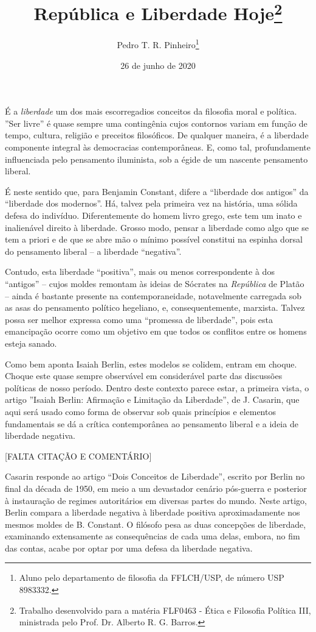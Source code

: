 \documentclass[12pt,a4paper]{article}
\author{Pedro T. R. Pinheiro\footnote{Aluno pelo departamento de filosofia 
da FFLCH/USP, de número USP 8983332. }}
\title{República e Liberdade Hoje\footnote{
	Trabalho desenvolvido para a matéria FLF0463 - Ética e Filosofia 
	Política III, ministrada pelo Prof. Dr. Alberto R. G. Barros. }}
\date{26 de junho de 2020}
\begin{document}
	\maketitle
	
	\onehalfspacing
	\setlength{\parskip}{0.5cm}

	É a \textit{liberdade} um dos mais escorregadios conceitos da 
	filosofia moral e política. ”Ser livre” é quase sempre uma 
	contingênia cujos contornos variam em função de tempo, cultura, 
	religião e preceitos filosóficos. De qualquer maneira, é a 
	liberdade componente integral às democracias contemporâneas. E, 
	como tal, profundamente influenciada pelo pensamento iluminista, 
	sob a égide de um nascente pensamento liberal. 

	É neste sentido que, para Benjamin Constant, difere a “liberdade 
	dos antigos” da “liberdade dos modernos”. Há, talvez pela primeira 
	vez na história, uma sólida defesa do indivíduo. Diferentemente do 
	homem livro grego, este tem um inato e inalienável direito à 
	liberdade. Grosso modo, pensar a liberdade como algo que se tem 
	a priori e de que se abre mão o mínimo possível constitui na 
	espinha dorsal do pensamento liberal -- a liberdade “negativa”. 

	Contudo, esta liberdade “positiva”, mais ou menos correspondente 
	à dos “antigos” -- cujos moldes remontam às ideias de Sócrates na 
	\textit{República} de Platão -- ainda é bastante presente na 
	contemporaneidade, notavelmente carregada sob as asas do pensamento 
	político hegeliano, e, consequentemente, marxista. Talvez possa ser 
	melhor expressa como uma “promessa de liberdade”, pois esta 
	emancipação ocorre como um objetivo em que todos os conflitos entre 
	os homens esteja sanado. 

	Como bem aponta Isaiah Berlin, estes modelos se colidem, entram em 
	choque. Choque este quase sempre observável em considerável parte 
	das discussões políticas de nosso período. Dentro deste contexto 
	parece estar, a primeira vista, o artigo ”Isaiah Berlin: Afirmação 
	e Limitação da Liberdade”, de J. Casarin, que aqui será usado como 
	forma de observar sob quais princípios e elementos fundamentais se 
	dá a crítica contemporânea ao pensamento liberal e a ideia de 
	liberdade negativa. 

	[FALTA CITAÇÃO E COMENTÁRIO]
	
	Casarin responde ao artigo “Dois Conceitos de Liberdade”, escrito 
	por Berlin no final da década de 1950, em meio a um devastador 
	cenário pós-guerra e posterior à instauração de regimes autoritários 
	em diversas partes do mundo. Neste artigo, Berlin compara a liberdade 
	negativa à liberdade positiva aproximadamente nos mesmos moldes de 
	B. Constant. O filósofo pesa as duas concepções de liberdade, 
	examinando extensamente as consequências de cada uma delas, embora, 
	no fim das contas, acabe por optar por uma defesa da liberdade 
	negativa. 
\end{document}

